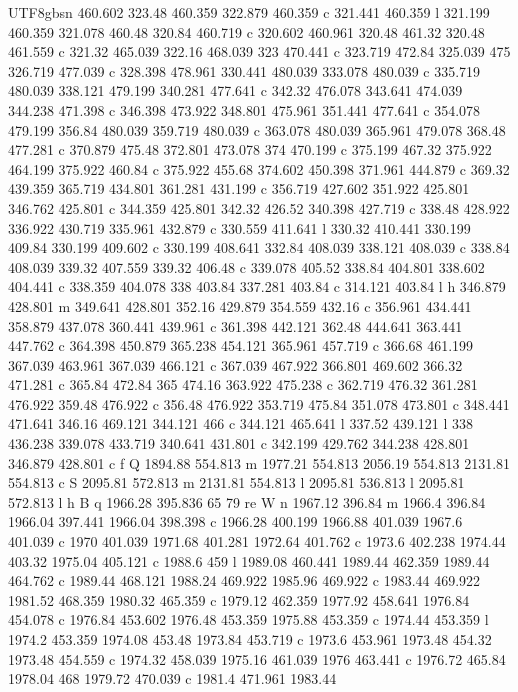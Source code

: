 \documentclass[11pt,a4paper,oneside]{report}
\begin{document}
\begin{CJK*}{UTF8}{gbsn}
{460.602 323.48 460.359 322.879 460.359 c 321.441 460.359 l 321.199 460.359 321.078 460.48 320.84 460.719
c 320.602 460.961 320.48 461.32 320.48 461.559 c 321.32 465.039 322.16 468.039 323 470.441 c 323.719
472.84 325.039 475 326.719 477.039 c 328.398 478.961 330.441 480.039 333.078 480.039 c 335.719 480.039
338.121 479.199 340.281 477.641 c 342.32 476.078 343.641 474.039 344.238 471.398 c 346.398 473.922
348.801 475.961 351.441 477.641 c 354.078 479.199 356.84 480.039 359.719 480.039 c 363.078 480.039
365.961 479.078 368.48 477.281 c 370.879 475.48 372.801 473.078 374 470.199 c 375.199 467.32 375.922
464.199 375.922 460.84 c 375.922 455.68 374.602 450.398 371.961 444.879 c 369.32 439.359 365.719 434.801
361.281 431.199 c 356.719 427.602 351.922 425.801 346.762 425.801 c 344.359 425.801 342.32 426.52 340.398
427.719 c 338.48 428.922 336.922 430.719 335.961 432.879 c 330.559 411.641 l 330.32 410.441 330.199
409.84 330.199 409.602 c 330.199 408.641 332.84 408.039 338.121 408.039 c 338.84 408.039 339.32 407.559
339.32 406.48 c 339.078 405.52 338.84 404.801 338.602 404.441 c 338.359 404.078 338 403.84 337.281 403.84
c 314.121 403.84 l h 346.879 428.801 m 349.641 428.801 352.16 429.879 354.559 432.16 c 356.961 434.441
358.879 437.078 360.441 439.961 c 361.398 442.121 362.48 444.641 363.441 447.762 c 364.398 450.879
365.238 454.121 365.961 457.719 c 366.68 461.199 367.039 463.961 367.039 466.121 c 367.039 467.922
366.801 469.602 366.32 471.281 c 365.84 472.84 365 474.16 363.922 475.238 c 362.719 476.32 361.281
476.922 359.48 476.922 c 356.48 476.922 353.719 475.84 351.078 473.801 c 348.441 471.641 346.16 469.121
344.121 466 c 344.121 465.641 l 337.52 439.121 l 338 436.238 339.078 433.719 340.641 431.801 c 342.199
429.762 344.238 428.801 346.879 428.801 c f Q 1894.88 554.813 m 1977.21 554.813 2056.19 554.813 2131.81
554.813 c S 2095.81 572.813 m 2131.81 554.813 l 2095.81 536.813 l 2095.81 572.813 l h B q 1966.28 395.836
65 79 re W n 1967.12 396.84 m 1966.4 396.84 1966.04 397.441 1966.04 398.398 c 1966.28 400.199 1966.88
401.039 1967.6 401.039 c 1970 401.039 1971.68 401.281 1972.64 401.762 c 1973.6 402.238 1974.44 403.32
1975.04 405.121 c 1988.6 459 l 1989.08 460.441 1989.44 462.359 1989.44 464.762 c 1989.44 468.121 1988.24
469.922 1985.96 469.922 c 1983.44 469.922 1981.52 468.359 1980.32 465.359 c 1979.12 462.359 1977.92
458.641 1976.84 454.078 c 1976.84 453.602 1976.48 453.359 1975.88 453.359 c 1974.44 453.359 l 1974.2
453.359 1974.08 453.48 1973.84 453.719 c 1973.6 453.961 1973.48 454.32 1973.48 454.559 c 1974.32 458.039
1975.16 461.039 1976 463.441 c 1976.72 465.84 1978.04 468 1979.72 470.039 c 1981.4 471.961 1983.44
}
\end{CJK*}
\end{document}
